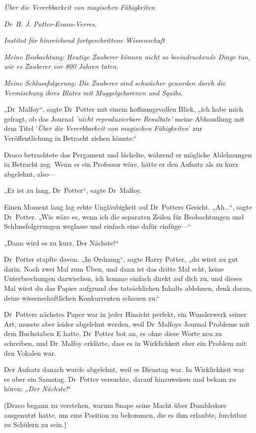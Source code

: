 {\emph{Über die Vererbbarkeit von magischen Fähigkeiten}

\emph{Dr~H. J. Potter-Evans-Verres,}

\emph{Institut für hinreichend fortgeschrittene Wissenschaft}

\emph{Meine Beobachtung: Heutige Zauberer können nicht so beeindruckende Dinge tun, wie es Zauberer vor 800 Jahren taten.}

\emph{Meine Schlussfolgerung: Die Zauberer sind schwächer geworden durch die Vermischung ihres Blutes mit Muggelgeborenen und Squibs.}

„Dr~Malfoy“, sagte Dr~Potter mit einem hoffnungsvollen Blick, „ich habe mich gefragt, ob das Journal \emph{'nicht reproduzierbare Resultate'} meine Abhandlung mit dem Titel '\emph{Über die Vererbbarkeit von magischen Fähigkeiten}' zur Veröffentlichung in Betracht ziehen könnte.“

Draco betrachtete das Pergament und lächelte, während er mögliche Ablehnungen in Betracht zog. Wenn er ein Professor wäre, hätte er den Aufsatz als zu kurz abgelehnt, also—

„Er ist zu lang, Dr~Potter“, sagte Dr~Malfoy.

Einen Moment lang lag echte Ungläubigkeit auf Dr~Potters Gesicht. „Ah…“, sagte Dr~Potter. „Wie wäre es, wenn ich die separaten Zeilen für Beobachtungen und Schlussfolgerungen weglasse und einfach eine dafür einfüge—“

„Dann wird es zu kurz. Der Nächste!“

Dr~Potter stapfte davon. „In Ordnung“, sagte Harry Potter, „du wirst zu gut darin. Noch zwei Mal zum Üben, und dann ist das dritte Mal echt, keine Unterbrechungen dazwischen, ich komme einfach direkt auf dich zu, und dieses Mal wirst du das Papier aufgrund des tatsächlichen Inhalts ablehnen, denk daran, deine wissenschaftlichen Konkurrenten schauen zu.“

Dr~Potters nächstes Paper war in jeder Hinsicht perfekt, ein Wunderwerk seiner Art, musste aber leider abgelehnt werden, weil Dr~Malfoys Journal Probleme mit dem Buchstaben E hatte. Dr~Potter bot an, es ohne diese Worte neu zu schreiben, und Dr~Malfoy erklärte, dass es in Wirklichkeit eher ein Problem mit den Vokalen war.

Der Aufsatz danach wurde abgelehnt, weil es Dienstag war. In Wirklichkeit war es aber ein Samstag. Dr~Potter versuchte, darauf hinzuweisen und bekam zu hören: „\emph{Der Nächste!}“

(Draco begann zu verstehen, warum Snape seine Macht über Dumbledore ausgenutzt hatte, um eine Position zu bekommen, die es ihm erlaubte, furchtbar zu Schülern zu sein.)

}
